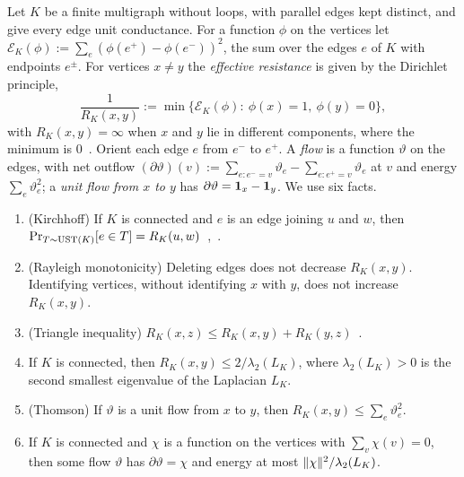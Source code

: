 Let $K$ be a finite multigraph without loops, with parallel edges kept distinct, and give every edge unit conductance. For a function $\phi$ on the vertices let $\mathcal E_K(\phi):=\sum_{e}(\phi(e^+)-\phi(e^-))^2$, the sum over the edges $e$ of $K$ with endpoints $e^\pm$. For vertices $x\ne y$ the \emph{effective resistance} is given by the Dirichlet principle,
\[
  \frac1{R_K(x,y)}:=\min\bigl\{\mathcal E_K(\phi):\ \phi(x)=1,\ \phi(y)=0\bigr\},
\]
with $R_K(x,y)=\infty$ when $x$ and $y$ lie in different components, where the minimum is $0$~\cite[Ch.~2]{LyonsPeres16}. Orient each edge $e$ from $e^-$ to $e^+$. A \emph{flow} is a function $\vartheta$ on the edges, with net outflow $(\partial\vartheta)(v):=\sum_{e:e^-=v}\vartheta_e-\sum_{e:e^+=v}\vartheta_e$ at $v$ and energy $\sum_e\vartheta_e^2$; a \emph{unit flow from $x$ to $y$} has $\partial\vartheta=\mathbf{1}_x-\mathbf{1}_y$. We use six facts.
\begin{enumerate}[label=(E\arabic*)]
\item\label{E:kirchhoff} (Kirchhoff) If $K$ is connected and $e$ is an edge joining $u$ and $w$, then $\Pr_{T\sim\mathrm{UST}(K)}[e\in T]=R_K(u,w)$~\cite{Kirchhoff1847},~\cite[Ch.~4]{LyonsPeres16}.
\item\label{E:rayleigh} (Rayleigh monotonicity) Deleting edges does not decrease $R_K(x,y)$. Identifying vertices, without identifying $x$ with $y$, does not increase $R_K(x,y)$.
\item\label{E:metric} (Triangle inequality) $R_K(x,z)\le R_K(x,y)+R_K(y,z)$~\cite{KleinRandic93}.
\item\label{E:spectral} If $K$ is connected, then $R_K(x,y)\le2/\lambda_2(L_K)$, where $\lambda_2(L_K)>0$ is the second smallest eigenvalue of the Laplacian $L_K$.
\item\label{E:thomson} (Thomson) If $\vartheta$ is a unit flow from $x$ to $y$, then $R_K(x,y)\le\sum_e\vartheta_e^2$.
\item\label{E:flow} If $K$ is connected and $\chi$ is a function on the vertices with $\sum_v\chi(v)=0$, then some flow $\vartheta$ has $\partial\vartheta=\chi$ and energy at most $\lVert \chi\rVert^2/\lambda_2(L_K)$.
\end{enumerate}
